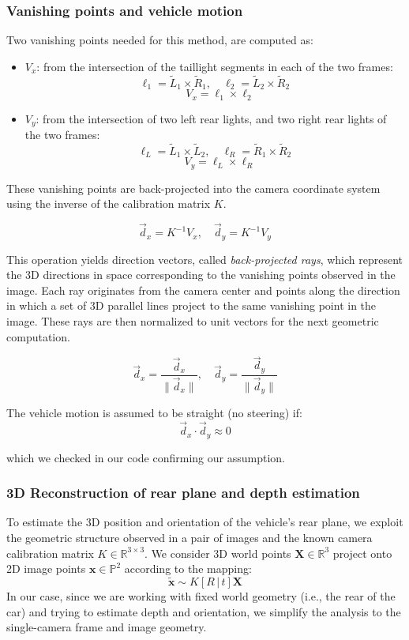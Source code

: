 \subsubsection{Vanishing points and vehicle motion}
Two vanishing points needed for this method, are computed as:
\begin{itemize}
    \item \( V_x \): from the intersection of the taillight segments in each of the two frames:
    \[
    \ell_1 = \tilde{L}_1 \times \tilde{R}_1, \quad \ell_2 = \tilde{L}_2 \times \tilde{R}_2
    \]
    \[ \quad V_x = \ell_1 \times \ell_2
    \]
    \item \( V_y \): from the intersection of two left rear lights, and two right rear lights of the two frames:
    \[
    \ell_L = \tilde{L}_1 \times \tilde{L}_2, \quad \ell_R = \tilde{R}_1 \times \tilde{R}_2 \]
    \[\quad V_y = \ell_L \times \ell_R
    \]
\end{itemize}

These vanishing points are back-projected into the camera coordinate system using the inverse of the calibration matrix \( K \).

\[
\vec{d}_x = K^{-1} V_x, \quad \vec{d}_y = K^{-1} V_y
\]

This operation yields direction vectors, called \textit{back-projected rays}, which represent the 3D directions in space corresponding to the vanishing points observed in the image. Each ray originates from the camera center and points along the direction in which a set of 3D parallel lines project to the same vanishing point in the image. These rays are then normalized to unit vectors for the next geometric computation.

\[
\vec{d}_x = \frac{\vec{d}_x}{\|\vec{d}_x\|}, \quad \vec{d}_y = \frac{\vec{d}_y}{\|\vec{d}_y\|}
\]

The vehicle motion is assumed to be straight (no steering) if:
\[
\vec{d}_x \cdot \vec{d}_y \approx 0
\]

which we checked in our code confirming our assumption.

\subsubsection*{3D Reconstruction of rear plane and depth estimation}


To estimate the 3D position and orientation of the vehicle's rear plane, we exploit the geometric structure observed in a pair of images and the known camera calibration matrix \( K \in \mathbb{R}^{3 \times 3} \). We consider 3D world points \( \mathbf{X} \in \mathbb{R}^3 \) project onto 2D image points \( \mathbf{x} \in \mathbb{P}^2 \) according to the mapping:
\[
\tilde{\mathbf{x}} \sim K [R \, | \, t] \mathbf{X}
\]
In our case, since we are working with fixed world geometry (i.e., the rear of the car) and trying to estimate depth and orientation, we simplify the analysis to the single-camera frame and image geometry.

